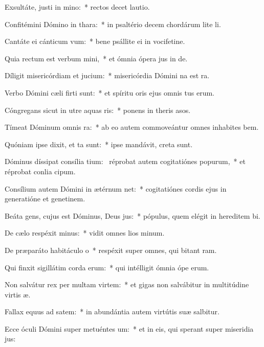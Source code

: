 \item Exsultáte, justi in mino:~* rectos decet lautio.
\item Confitémini Dómino in thara:~* in psaltério decem chordárum lite li.
\item Cantáte ei cánticum vum:~* bene psállite ei in vocifetine.
\item Quia rectum est verbum mini,~* et ómnia ópera jus in de.
\item Díligit misericórdiam et jucium:~* misericórdia Dómini na est ra.
\item Verbo Dómini cæli firti sunt:~* et spíritu oris ejus omnis tus erum.
\item Cóngregans sicut in utre aquas ris:~* ponens in theris asos.
\item Tímeat Dóminum omnis ra:~* ab eo autem commoveántur omnes inhabites bem.
\item Quóniam ipse dixit, et ta sunt:~* ipse mandávit,  creta sunt.
\item Dóminus díssipat consília tium:~\pscross{} réprobat autem cogitatiónes popurum,~* et réprobat conlia cipum.
\item Consílium autem Dómini in ætérnum net:~* cogitatiónes cordis ejus in generatióne et genetinem.
\item Beáta gens, cujus est Dóminus, Deus jus:~* pópulus, quem elégit in hereditem bi.
\item De cælo respéxit minus:~* vidit omnes lios minum.
\item De præparáto habitáculo o~* respéxit super omnes, qui bitant ram.
\item Qui finxit sigillátim corda erum:~* qui intélligit ómnia ópe erum.
\item Non salvátur rex per multam virtem:~* et gigas non salvábitur in multitúdine virtis æ.
\item Fallax equus ad satem:~* in abundántia autem virtútis suæ  salbitur.
\item Ecce óculi Dómini super metuéntes um:~* et in eis, qui sperant super miseridia jus:
